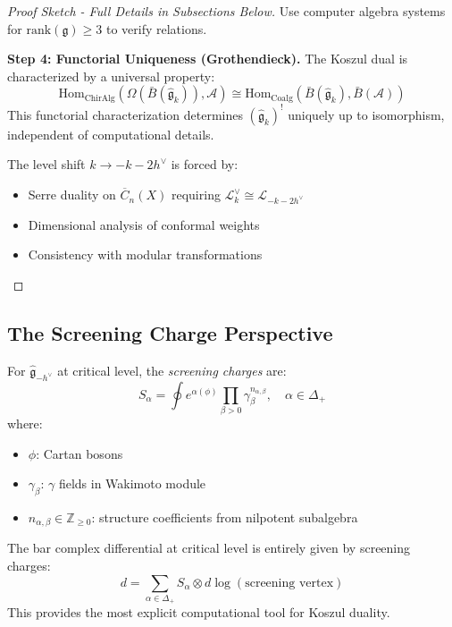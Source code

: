 \begin{proof}[Proof Sketch - Full Details in Subsections Below]
Use computer algebra systems for $\mathrm{rank}(\mathfrak{g}) \geq 3$ to verify relations.

\textbf{Step 4: Functorial Uniqueness (Grothendieck).}
The Koszul dual is characterized by a universal property:
\begin{equation}
\mathrm{Hom}_{\text{ChirAlg}}(\Omega(\bar{B}(\widehat{\mathfrak{g}}_k)), \mathcal{A}) \cong \mathrm{Hom}_{\text{Coalg}}(\bar{B}(\widehat{\mathfrak{g}}_k), \bar{B}(\mathcal{A}))
\end{equation}
This functorial characterization determines $(\widehat{\mathfrak{g}}_k)^!$ uniquely up to isomorphism, independent of computational details.

The level shift $k \to -k-2h^\vee$ is forced by:
\begin{itemize}
\item Serre duality on $\overline{C}_n(X)$ requiring $\mathcal{L}_k^\vee \cong \mathcal{L}_{-k-2h^\vee}$
\item Dimensional analysis of conformal weights
\item Consistency with modular transformations
\end{itemize}
\end{proof}

\subsection{The Screening Charge Perspective}

\begin{definition}
For $\widehat{\mathfrak{g}}_{-h^\vee}$ at critical level, the \emph{screening charges} are:
\begin{equation}
S_\alpha = \oint e^{\alpha(\phi)} \prod_{\beta > 0} \gamma_\beta^{n_{\alpha,\beta}}, \quad \alpha \in \Delta_+
\end{equation}
where:
\begin{itemize}
\item $\phi$: Cartan bosons
\item $\gamma_\beta$: $\gamma$ fields in Wakimoto module
\item $n_{\alpha,\beta} \in \mathbb{Z}_{\geq 0}$: structure coefficients from nilpotent subalgebra
\end{itemize}
\end{definition}

\begin{theorem}\label{thm:screening-bar}
The bar complex differential at critical level is entirely given by screening charges:
\begin{equation}
d = \sum_{\alpha \in \Delta_+} S_\alpha \otimes d\log(\text{screening vertex})
\end{equation}
This provides the most explicit computational tool for Koszul duality.
\end{theorem}

